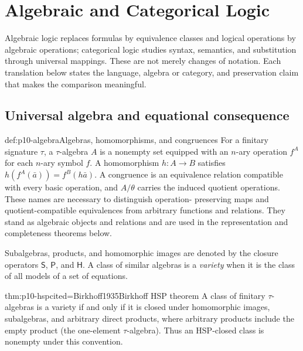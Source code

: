 \chapter{Algebraic and Categorical Logic}
\label{sec:p10-algebraic-and-categorical-logic}

Algebraic logic replaces formulas by equivalence classes and logical
operations by algebraic operations; categorical logic studies syntax,
semantics, and substitution through universal mappings. These are not merely
changes of notation. Each translation below states the language, algebra or
category, and preservation claim that makes the comparison meaningful.

\section{Universal algebra and equational consequence}
\label{sec:p10-universal-algebra}

\begin{hbdefinition}{def:p10-algebra}{Algebras, homomorphisms, and congruences}
For a finitary signature \(\tau\), a \(\tau\)-algebra \(A\) is a nonempty set
equipped with an \(n\)-ary operation \(f^A\) for each \(n\)-ary symbol \(f\).
A homomorphism \(h:A\to B\) satisfies
\(h(f^A(\bar a))=f^B(h\bar a)\). A congruence is an equivalence relation
compatible with every basic operation, and \(A/\theta\) carries the induced
quotient operations. These names are necessary to distinguish operation-
preserving maps and quotient-compatible equivalences from arbitrary functions
and relations. They stand as algebraic objects and relations and are used in
the representation and completeness theorems below.
\end{hbdefinition}

Subalgebras, products, and homomorphic images are denoted by the closure
operators \(\mathsf S\), \(\mathsf P\), and \(\mathsf H\). A class of similar
algebras is a \emph{variety} when it is the class of all models of a set of
equations.

\begin{hbtheorem}{thm:p10-hsp}{cited=Birkhoff1935}{Birkhoff HSP theorem}
A class of finitary \(\tau\)-algebras is a variety if and only if it is closed
under homomorphic images, subalgebras, and arbitrary direct products, where
arbitrary products include the empty product (the one-element
\(\tau\)-algebra). Thus an HSP-closed class is nonempty under this convention.
\end{hbtheorem}

